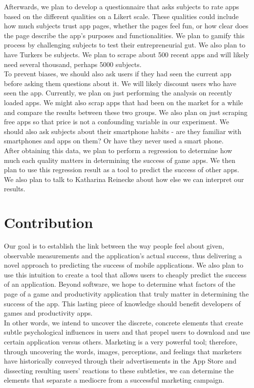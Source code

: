 \documentclass{article}
\begin{document}
Afterwards, we plan to develop a questionnaire that asks subjects to rate apps based on the different qualities on a Likert scale. These qualities could include how much subjects trust app pages, whether the pages feel fun, or how clear does the page describe the app’s purposes and functionalities. We plan to gamify this process by challenging subjects to test their entrepreneurial gut. We also plan to have Turkers be subjects. We plan to scrape about 500 recent apps and will likely need several thousand, perhaps 5000 subjects. \\

To prevent biases, we should also ask users if they had seen the current app before asking them questions about it. We will likely discount users who have seen the app. Currently, we plan on just performing the analysis on recently loaded apps. We might also scrap apps that had been on the market for a while and compare the results between these two groups. We also plan on just scraping free apps so that price is not a confounding variable in our experiment. We should also ask subjects about their smartphone habits - are they familiar with smartphones and apps on them? Or have they never used a smart phone. \\

After obtaining this data, we plan to perform a regression to determine how much each quality matters in determining the success of game apps. We then plan to use this regression result as a tool to predict the success of other apps. We also plan to talk to Katharina Reinecke about how else we can interpret our results.

\section{Contribution}

Our goal is to establish the link between the way people feel about given, observable measurements and the application’s actual success, thus delivering a novel approach to predicting the success of mobile applications. We also plan to use this intuition to create a tool that allows users to cheaply predict the success of an application. Beyond software, we hope to determine what factors of the page of a game and productivity application that truly matter in determining the success of the app. This lasting piece of knowledge should benefit developers of games and productivity apps. \\
 
In other words, we intend to uncover the discrete, concrete elements that create subtle psychological influences in users and that propel users to download and use certain  application versus others.  Marketing is a very powerful tool; therefore, through uncovering the words, images, perceptions, and feelings that marketers have historically conveyed through their advertisements in the App Store and dissecting resulting users’ reactions to these subtleties, we can determine the elements that separate a mediocre from a successful marketing campaign. 
\end{document}
